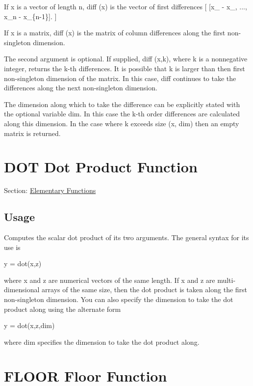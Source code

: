 If {\ttfamily x} is a vector of length n, {\ttfamily diff (x)} is the vector of first differences \mbox{[} \mbox{[}x\-\_ -\/ x\-\_, ..., x\-\_\-n -\/ x\-\_\-\{n-\/1\}\mbox{]}. \mbox{]}

If {\ttfamily x} is a matrix, {\ttfamily diff (x)} is the matrix of column differences along the first non-\/singleton dimension.

The second argument is optional. If supplied, {\ttfamily diff (x,k)}, where {\ttfamily k} is a nonnegative integer, returns the {\ttfamily k}-\/th differences. It is possible that {\ttfamily k} is larger than then first non-\/singleton dimension of the matrix. In this case, {\ttfamily diff} continues to take the differences along the next non-\/singleton dimension.

The dimension along which to take the difference can be explicitly stated with the optional variable {\ttfamily dim}. In this case the {\ttfamily k}-\/th order differences are calculated along this dimension. In the case where {\ttfamily k} exceeds {\ttfamily size (x, dim)} then an empty matrix is returned. \hypertarget{elementary_dot}{}\section{D\-O\-T Dot Product Function}\label{elementary_dot}
Section\-: \hyperlink{sec_elementary}{Elementary Functions} \hypertarget{vtkwidgets_vtkxyplotwidget_Usage}{}\subsection{Usage}\label{vtkwidgets_vtkxyplotwidget_Usage}
Computes the scalar dot product of its two arguments. The general syntax for its use is \begin{DoxyVerb}  y = dot(x,z)
\end{DoxyVerb}
 where {\ttfamily x} and {\ttfamily z} are numerical vectors of the same length. If {\ttfamily x} and {\ttfamily z} are multi-\/dimensional arrays of the same size, then the dot product is taken along the first non-\/singleton dimension. You can also specify the dimension to take the dot product along using the alternate form \begin{DoxyVerb}  y = dot(x,z,dim)
\end{DoxyVerb}
 where {\ttfamily dim} specifies the dimension to take the dot product along. \hypertarget{elementary_floor}{}\section{F\-L\-O\-O\-R Floor Function}\label{elementary_floor}
